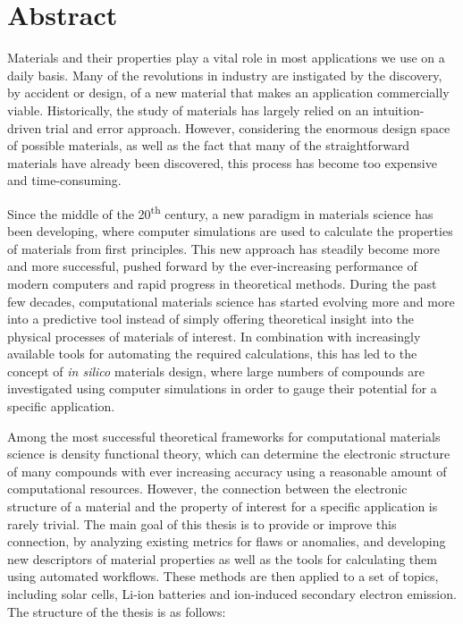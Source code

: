 \chapter*{Abstract} \label{chapter:abstract}

Materials and their properties play a vital role in most applications we use on 
a daily basis. Many of the revolutions in industry are instigated by the 
discovery, by accident or design, of a new material that makes an application 
commercially viable. Historically, the study of materials has largely relied on 
an intuition-driven trial and error approach. However, considering the enormous 
design space of possible materials, as well as the fact that many of the 
straightforward materials have already been discovered, this process has become 
too expensive and time-consuming. 

Since the middle of the 20\textsuperscript{th} century, a new paradigm in 
materials science has been developing, where computer simulations are used to 
calculate the properties of materials from first principles. This new approach 
has steadily become more and more successful, pushed forward by the 
ever-increasing performance of modern computers and rapid progress in 
theoretical methods. During the past few decades, computational materials 
science has started evolving more and more into a predictive tool instead of 
simply offering theoretical insight into the physical processes of materials 
of interest. In combination with increasingly available tools for automating 
the required calculations, this has led to the concept of \textit{in silico} 
materials design, where large numbers of compounds are investigated using 
computer simulations in order to gauge their potential for a specific application.

Among the most successful theoretical frameworks for computational materials 
science is density functional theory, which can determine the electronic 
structure of many compounds with ever increasing accuracy using a reasonable 
amount of computational resources. However, the connection between the 
electronic structure of a material and the property of interest for a specific 
application is rarely trivial. The main goal of this thesis is to provide or 
improve this connection, by analyzing existing metrics for flaws or anomalies, 
and developing new descriptors of material properties as well as the tools for 
calculating them using automated workflows. These methods are then applied to 
a set of topics, including solar cells, Li-ion batteries and ion-induced 
secondary electron emission. The structure of the thesis is as follows:

